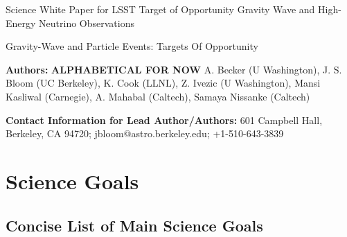 \documentclass [11pt]{article}
\begin{document}

\centerline {\Large Science White Paper for LSST Target of Opportunity Gravity Wave and High-Energy Neutrino Observations}

\vspace*{0.2 cm}


%

\centerline {\Large Gravity-Wave and Particle Events: Targets Of Opportunity}

\vspace*{0.4 cm}

\noindent 
{\bf Authors:} {\bf ALPHABETICAL FOR NOW} A. Becker (U Washington),  J. S. Bloom (UC Berkeley), K. Cook (LLNL), Z. Ivezic (U Washington), Mansi Kasliwal (Carnegie), A. Mahabal (Caltech), Samaya Nissanke (Caltech) 


\vspace*{0.2 cm}

\noindent 
{\bf Contact Information for Lead Author/Authors:} 601 Campbell Hall, Berkeley, CA 94720; jbloom@astro.berkeley.edu; +1-510-643-3839

\vspace*{0.2 cm}


\section{Science Goals}


\subsection{Concise List of Main Science Goals}

\end{document}

